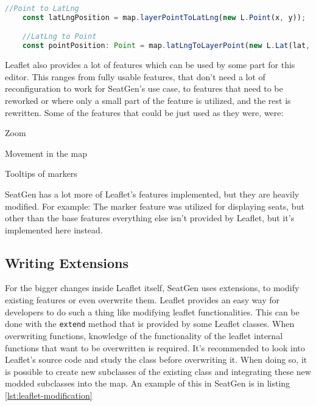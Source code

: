 \begin{lstlisting}[language=TypeScript, caption={Latitude Longitude and Point conversion}, label={lst:latlng-point}]
    //Point to LatLng
    const latLngPosition = map.layerPointToLatLng(new L.Point(x, y));

    //LatLng to Point
    const pointPosition: Point = map.latLngToLayerPoint(new L.Lat(lat, lng));
\end{lstlisting}

Leaflet also provides a lot of features which can be used by some part for this editor. This ranges from fully usable features, that don't need a lot of reconfiguration to work for SeatGen's use case, to features that need to be reworked or where only a small part of the feature is utilized, and the rest is rewritten. Some of the features that could be just used as they were, were:
\begin{compactitem}
\item Zoom
\item Movement in the map
\item Tooltips of markers
\end{compactitem} 

SeatGen has a lot more of Leaflet's features implemented, but they are heavily modified. For example: The marker feature was utilized for displaying seats, but other than the base features everything else isn't provided by Leaflet, but it's implemented here instead.

\subsection{Writing Extensions}
For the bigger changes inside Leaflet itself, SeatGen uses extensions, to modify existing features or even overwrite them. Leaflet provides an easy way for developers to do such a thing like modifying leaflet functionalities. This can be done with the \texttt{extend} method that is provided by some Leaflet classes. When overwriting functions, knowledge of the functionality of the leaflet internal functions that want to be overwritten is required. It's recommended to look into Leaflet's source code and study the class before overwriting it. When doing so, it is possible to create new subclasses of the existing class and integrating these new modded subclasses into the map. An example of this in SeatGen is in listing \ref{lst:leaflet-modification}

